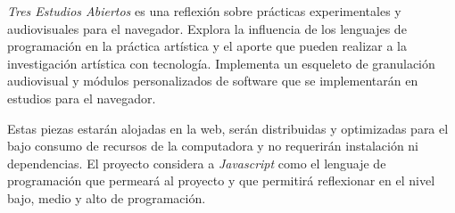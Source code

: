 
\textit{Tres Estudios Abiertos} es una reflexión sobre prácticas experimentales y audiovisuales para el navegador. Explora la influencia de los lenguajes de programación en la práctica artística y el aporte que pueden realizar a la investigación artística con tecnología. Implementa un esqueleto de granulación audiovisual y módulos personalizados de software que se implementarán en estudios para el navegador. 


Estas piezas estarán alojadas en la web, serán distribuidas y optimizadas para el bajo consumo de recursos de la computadora y no requerirán instalación ni dependencias. El proyecto considera a \textit{Javascript} como el lenguaje de programación que permeará al proyecto y que permitirá reflexionar en el nivel bajo, medio y alto de programación. %
